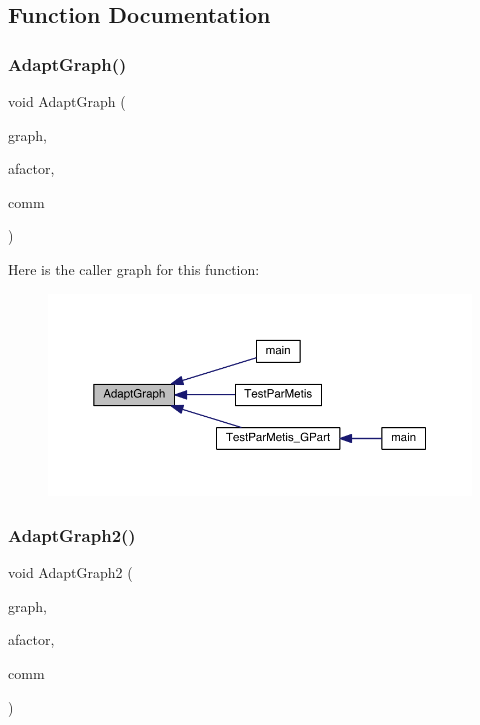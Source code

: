 \subsection{Function Documentation}
\mbox{\label{a00422_abe7cfd52605c309687e45b1d1e0d936c}} 
\subsubsection{\texorpdfstring{Adapt\+Graph()}{AdaptGraph()}}
{\footnotesize\ttfamily void Adapt\+Graph (\begin{DoxyParamCaption}\item[{\hyperlink{a00734}{graph\+\_\+t} $\ast$}]{graph,  }\item[{\hyperlink{a00876_aaa5262be3e700770163401acb0150f52}{idx\+\_\+t}}]{afactor,  }\item[{M\+P\+I\+\_\+\+Comm}]{comm }\end{DoxyParamCaption})}

Here is the caller graph for this function\+:\nopagebreak
\begin{figure}[H]
\begin{center}
\leavevmode
\includegraphics[width=350pt]{a00422_abe7cfd52605c309687e45b1d1e0d936c_icgraph}
\end{center}
\end{figure}
\mbox{\label{a00422_afc0964cfd8b3e05ef87d2f8cca22818f}} 
\subsubsection{\texorpdfstring{Adapt\+Graph2()}{AdaptGraph2()}}
{\footnotesize\ttfamily void Adapt\+Graph2 (\begin{DoxyParamCaption}\item[{\hyperlink{a00734}{graph\+\_\+t} $\ast$}]{graph,  }\item[{\hyperlink{a00876_aaa5262be3e700770163401acb0150f52}{idx\+\_\+t}}]{afactor,  }\item[{M\+P\+I\+\_\+\+Comm}]{comm }\end{DoxyParamCaption})}

